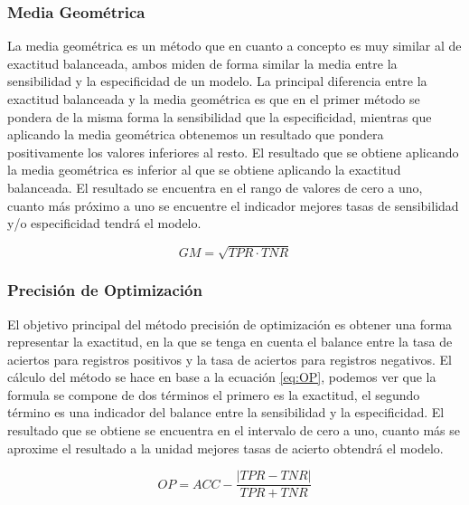 \subsubsection{Media Geométrica}

La media geométrica \cite{tharwat_2018} es un método que en cuanto a concepto es muy similar al de exactitud balanceada, ambos miden de forma similar la media entre la sensibilidad y la especificidad de un modelo. La principal diferencia entre la exactitud balanceada y la media geométrica es que en el primer método se pondera de la misma forma la sensibilidad que la especificidad, mientras que aplicando la media geométrica obtenemos un resultado que pondera positivamente los valores inferiores al resto. El resultado que se obtiene aplicando la media geométrica es inferior al que se obtiene aplicando la exactitud balanceada. El resultado se encuentra en el rango de valores de cero a uno, cuanto más próximo a uno se encuentre el indicador mejores tasas de sensibilidad y/o especificidad tendrá el modelo.

\bigbreak

\begin{equation}
    GM = \sqrt{TPR \cdot TNR}
    \label{eq:GM}
\end{equation}


\subsubsection{Precisión de Optimización}

El objetivo principal del método precisión de optimización \cite{OP2006} es obtener una forma representar la exactitud, en la que se tenga en cuenta el balance entre la tasa de aciertos para registros positivos y la tasa de aciertos para registros negativos. El cálculo del método se hace en base a la ecuación \ref{eq:OP}, podemos ver que la formula se compone de dos términos el primero es la exactitud, el segundo término es una indicador del balance entre la sensibilidad y la especificidad. El resultado que se obtiene se encuentra en el intervalo de cero a uno, cuanto más se aproxime el resultado a la unidad mejores tasas de acierto obtendrá el modelo.

\bigbreak

\begin{equation}
    OP = ACC - \frac{|TPR-TNR|}{TPR+TNR}
    \label{eq:OP}
\end{equation}

